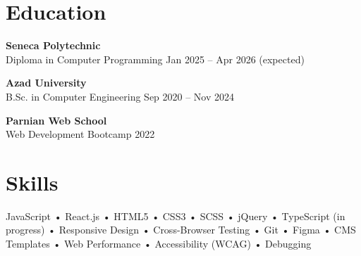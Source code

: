 \documentclass[letterpaper,11pt]{article}
\begin{document}
\vspace{0.6em}

\section*{Education}
\textbf{Seneca Polytechnic}\\
Diploma in Computer Programming \hfill Jan 2025 -- Apr 2026 (expected)

\textbf{Azad University}\\
B.Sc. in Computer Engineering \hfill Sep 2020 -- Nov 2024

\textbf{Parnian Web School}\\
Web Development Bootcamp \hfill 2022

\vspace{0.6em}

\section*{Skills}
JavaScript • React.js • HTML5 • CSS3 • SCSS • jQuery • TypeScript (in progress) • Responsive Design • Cross-Browser Testing • Git • Figma • CMS Templates • Web Performance • Accessibility (WCAG) • Debugging
\end{document}
